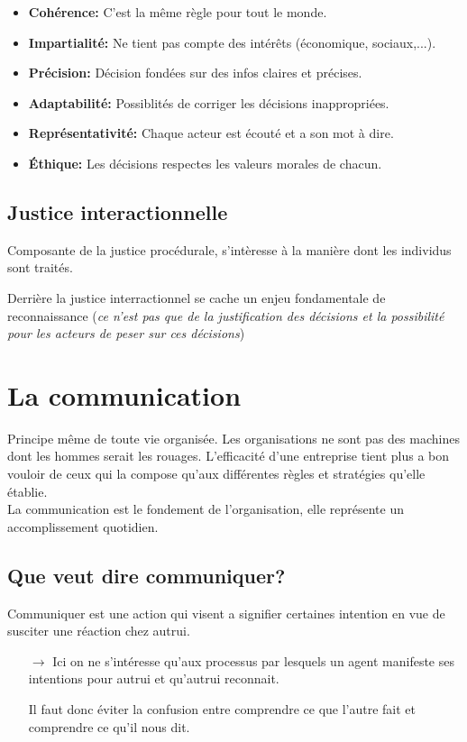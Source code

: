 \documentclass[11pt]{article} %
\begin{document}
\begin{itemize}
	\item \textbf{Cohérence:} C'est la même règle pour tout le monde.
	\item \textbf{Impartialité: } Ne tient pas compte des intérêts (économique, sociaux,...).
	\item \textbf{Précision: } Décision fondées sur des infos claires et précises.
	\item \textbf{Adaptabilité: } Possiblités de corriger les décisions inappropriées.
	\item \textbf{Représentativité: } Chaque acteur est écouté et a son mot à dire.
	\item \textbf{Éthique: } Les décisions respectes les valeurs morales de chacun.
\end{itemize}


\subsection{Justice interactionnelle}

Composante de la justice procédurale, s'intèresse à la manière dont les
individus sont traités.

Derrière la justice interractionnel se cache un enjeu fondamentale
de reconnaissance (\textit{ce n'est pas que de la justification des
décisions et la possibilité pour les acteurs de peser sur ces
décisions})


\section{La communication}

Principe même de toute vie organisée. Les organisations ne sont
pas des machines dont les hommes serait les rouages. L'efficacité
d'une entreprise tient plus a bon vouloir de ceux qui la compose
qu'aux différentes règles et stratégies qu'elle établie. \\ La
communication est le fondement de l'organisation, elle représente un
accomplissement quotidien.


\subsection{Que veut dire communiquer?}

Communiquer est une action qui visent a signifier certaines intention en
vue de susciter une réaction chez autrui.

\begin{itemize}
 \item[$\to$] Ici on ne s'intéresse qu'aux processus par lesquels un agent
     manifeste ses intentions pour autrui et qu'autrui reconnait.

     Il faut donc éviter la confusion entre comprendre ce que l'autre
     fait et comprendre ce qu'il nous dit.
\end{itemize}
\end{document}
